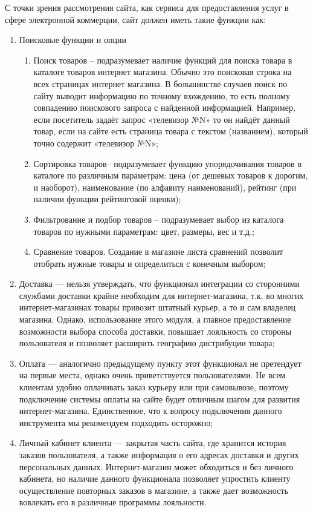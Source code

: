 С точки зрения рассмотрения сайта, как сервиса для предоставления услуг в сфере электронной коммерции, сайт должен иметь такие функции как:
\begin{enumerate}[label=\arabic*)]
    \item Поисковые функции и опции
    \begin{enumerate}[label=\arabic*)]
        \item Поиск товаров – подразумевает наличие функций для поиска товара в каталоге товаров интернет магазина.
        Обычно это поисковая строка на всех страницах интернет магазина.
        В большинстве случаев поиск по сайту выводит информацию по точному вхождению, то есть полному совпадению поискового запроса с найденной информацией.
        Например, если посетитель задаёт запрос «телевизор №N» то он найдёт данный товар, если на сайте есть страница товара с текстом (названием), который точно содержит «телевизор №N»;
        \item Сортировка товаров– подразумевает функцию упорядочивания товаров в каталоге по различным параметрам: цена (от дешевых товаров к дорогим, и наоборот), наименование (по алфавиту наименований), рейтинг (при наличии функции рейтинговой оценки);
        \item Фильтрование и подбор товаров – подразумевает выбор из каталога товаров по нужными параметрам: цвет, размеры, вес и т.д.;
        \item Сравнение товаров. Создание в магазине листа сравнений позволит отобрать нужные товары и определиться с конечным выбором;
    \end{enumerate}
    \item Доставка — нельзя утверждать, что функционал интеграции со сторонними службами доставки крайне необходим для интернет-магазина, т.к. во многих интернет-магазинах товары привозит штатный курьер, а то и сам владелец магазина.
    Однако, использование этого модуля, а главное предоставление возможности выбора способа доставки, повышает лояльность со стороны пользователя и позволяет расширить географию дистрибуции товара;
    \item Оплата — аналогично предыдущему пункту этот функционал не претендует на первые места, однако очень приветствуется пользователями.
    Не всем клиентам удобно оплачивать заказ курьеру или при самовывозе, поэтому подключение системы оплаты на сайте будет отличным шагом для развития интернет-магазина.
    Единственное, что к вопросу подключения данного инструмента мы рекомендуем подходить осторожно;
    \item Личный кабинет клиента — закрытая часть сайта, где хранится история заказов пользователя, а также информация о его адресах доставки и других персональных данных.
    Интернет-магазин может обходиться и без личного кабинета, но наличие данного функционала позволяет упростить клиенту осуществление повторных заказов в магазине, а также дает возможность вовлекать его в различные программы лояльности.
\end{enumerate}


